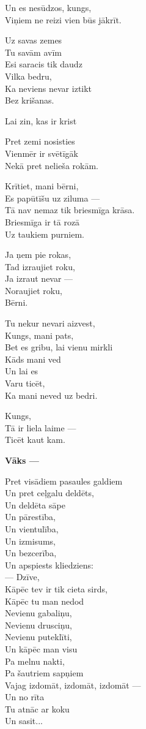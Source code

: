\documentclass[14pt]{extarticle}
\begin{document}
Un es nesūdzos, kungs,\\
Viņiem ne reizi vien būs jākrīt.

Uz savas zemes\\
Tu savām avīm\\
Esi saracis tik daudz\\
Vilka bedru,\\
Ka neviens nevar iztikt\\
Bez krišanas.

Lai zin, kas ir krist

Pret zemi nosisties\\
Vienmēr ir svētīgāk\\
Nekā pret nelieša rokām.

Krītiet, mani bērni,\\
Es papūtīšu uz ziluma ---\\
Tā nav nemaz tik briesmīga krāsa.\\
Briesmīga ir tā rozā\\
Uz taukiem purniem.

Ja ņem pie rokas,\\
Tad izraujiet roku,\\
Ja izraut nevar ---\\
Noraujiet roku,\\
Bērni.

Tu nekur nevari aizvest,\\
Kungs, mani pats,\\
Bet es gribu, lai vienu mirkli\\
Kāds mani ved\\
Un lai es\\
Varu ticēt,\\
Ka mani neved uz bedri.

Kungs,\\
Tā ir liela laime ---\\
Ticēt kaut kam.


\newpage

{\bf Vāks ---}

Pret visādiem pasaules galdiem\\
Un pret ceļgalu deldēts,\\
Un deldēta sāpe\\
Un pārestība,\\
Un vientulība,\\
Un izmisums,\\
Un bezcerība,\\
Un apspiests kliedziens:\\
--- Dzīve,\\
Kāpēc tev ir tik cieta sirds,\\
Kāpēc tu man nedod\\
Nevienu gabaliņu,\\
Nevienu drusciņu,\\
Nevienu puteklīti,\\
Un kāpēc man visu\\
Pa melnu nakti,\\
Pa šautriem sapņiem\\
Vajag izdomāt, izdomāt, izdomāt ---\\
Un no rīta\\
Tu atnāc ar koku\\
Un sasit...
\end{document}
